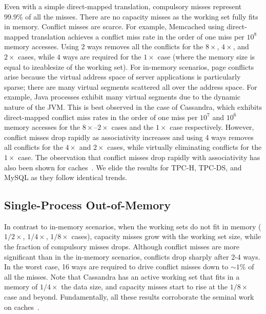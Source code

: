 Even with a simple direct-mapped translation, compulsory misses represent $99.9\%$ of all the misses. There are no capacity misses as the working set fully fits in memory. Conflict misses are scarce. For example, Memcached using direct-mapped translation achieves a conflict miss rate in the order of one miss per $10^{8}$ memory accesses. Using $2$ ways removes all the conflicts for the $8\times$, $4\times$, and $2\times$ cases, while $4$ ways are required for the $1\times$ case (where the memory size is equal to izeablesize of the working set). For in-memory scenarios, page conflicts arise because the virtual address space of server applications is particularly sparse; there are many virtual segments scattered all over the address space. For example, Java processes exhibit many virtual segments due to the dynamic nature of the JVM. This is best observed in the case of Cassandra, which exhibits direct-mapped conflict miss rates in the order of one miss per $10^{7}$ and $10^{6}$ memory accesses for the $8\times$--$2\times$ cases and the $1\times$ case respectively. However, conflict misses drop rapidly as associativity increases and using 4 ways removes all conflicts for the $4\times$ and $2\times$ cases, while virtually eliminating conflicts for the $1\times$ case. The observation that conflict misses drop rapidly with associativity has also been shown for caches~\cite{hill:aspects, cantin:cache}. We elide the results for TPC-H, TPC-DS, and MySQL as they follow identical trends.

\subsection{Single-Process Out-of-Memory}

In contrast to in-memory scenarios, when the working sets do not fit in memory ($1/2\times$, $1/4\times$, $1/8\times$ cases), capacity misses grow with the working set size, while the fraction of compulsory misses drops. Although conflict misses are more significant than in the in-memory scenarios, conflicts drop sharply after 2-4 ways. In the worst case, 16 ways are required to drive conflict misses down to $\sim1\%$ of all the misses. Note that Cassandra has an active working set that fits in a memory of $1/4\times$ the data size, and capacity misses start to rise at the $1/8\times$ case and beyond. Fundamentally, all these results corroborate the seminal work on caches~\cite{hill:aspects, cantin:cache}. 


